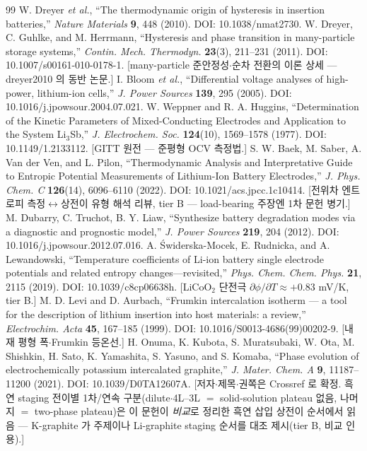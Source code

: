 \begin{thebibliography}{99}
 W. Dreyer \emph{et al.}, ``The thermodynamic origin of hysteresis in insertion batteries,'' \emph{Nature Materials} \textbf{9}, 448 (2010). DOI: 10.1038/nmat2730.
 W. Dreyer, C. Guhlke, and M. Herrmann, ``Hysteresis and phase transition in many-particle storage systems,'' \emph{Contin. Mech. Thermodyn.} \textbf{23}(3), 211--231 (2011). DOI: 10.1007/s00161-010-0178-1. [many-particle 준안정성$\cdot$순차 전환의 이론 상세 --- dreyer2010 의 동반 논문.]
 I. Bloom \emph{et al.}, ``Differential voltage analyses of high-power, lithium-ion cells,'' \emph{J. Power Sources} \textbf{139}, 295 (2005). DOI: 10.1016/j.jpowsour.2004.07.021.
 W. Weppner and R. A. Huggins, ``Determination of the Kinetic Parameters of Mixed-Conducting Electrodes and Application to the System Li$_3$Sb,'' \emph{J. Electrochem. Soc.} \textbf{124}(10), 1569--1578 (1977). DOI: 10.1149/1.2133112. [GITT 원전 --- 준평형 OCV 측정법.]
 S. W. Baek, M. Saber, A. Van der Ven, and L. Pilon, ``Thermodynamic Analysis and Interpretative Guide to Entropic Potential Measurements of Lithium-Ion Battery Electrodes,'' \emph{J. Phys. Chem. C} \textbf{126}(14), 6096--6110 (2022). DOI: 10.1021/acs.jpcc.1c10414. [전위차 엔트로피 측정$\leftrightarrow$상전이 유형 해석 리뷰, tier B --- load-bearing 주장엔 1차 문헌 병기.]
 M. Dubarry, C. Truchot, B. Y. Liaw, ``Synthesize battery degradation modes via a diagnostic and prognostic model,'' \emph{J. Power Sources} \textbf{219}, 204 (2012). DOI: 10.1016/j.jpowsour.2012.07.016.
 A. {\'S}widerska-Mocek, E. Rudnicka, and A. Lewandowski, ``Temperature coefficients of Li-ion battery single electrode potentials and related entropy changes---revisited,'' \emph{Phys. Chem. Chem. Phys.} \textbf{21}, 2115 (2019). DOI: 10.1039/c8cp06638h. [LiCoO$_2$ 단전극 $\partial\phi/\partial T\approx+0.83$ mV/K, tier B.]
 M. D. Levi and D. Aurbach, ``Frumkin intercalation isotherm --- a tool for the description of lithium insertion into host materials: a review,'' \emph{Electrochim. Acta} \textbf{45}, 167--185 (1999). DOI: 10.1016/S0013-4686(99)00202-9. [내재 평형 폭$\cdot$Frumkin 등온선.]
 H. Onuma, K. Kubota, S. Muratsubaki, W. Ota, M. Shishkin, H. Sato, K. Yamashita, S. Yasuno, and S. Komaba, ``Phase evolution of electrochemically potassium intercalated graphite,'' \emph{J. Mater. Chem. A} \textbf{9}, 11187--11200 (2021). DOI: 10.1039/D0TA12607A. [저자$\cdot$제목$\cdot$권쪽은 Crossref 로 확정. 흑연 staging 전이별 1차/연속 구분(dilute$\cdot$4L--3L $=$ solid-solution plateau 없음, 나머지 $=$ two-phase plateau)은 이 문헌이 \emph{비교}로 정리한 흑연 삽입 상전이 순서에서 읽음 --- K-graphite 가 주제이나 Li-graphite staging 순서를 대조 제시(tier B, 비교 인용).]

\end{thebibliography}
